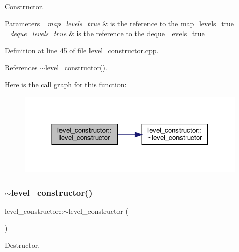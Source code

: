 Constructor. 


\begin{DoxyParams}{Parameters}
{\em \+\_\+map\+\_\+levels\+\_\+true} & is the reference to the map\+\_\+levels\+\_\+true \\
\hline
{\em \+\_\+deque\+\_\+levels\+\_\+true} & is the reference to the deque\+\_\+levels\+\_\+true \\
\hline
\end{DoxyParams}


Definition at line 45 of file level\+\_\+constructor.\+cpp.



References $\sim$level\+\_\+constructor().

Here is the call graph for this function\+:
\nopagebreak
\begin{figure}[H]
\begin{center}
\leavevmode
\includegraphics[width=310pt]{dd/d07/classlevel__constructor_af87499ee57672a337d8cb6e4261d5a47_cgraph}
\end{center}
\end{figure}
\mbox{\label{classlevel__constructor_aa52e6e3db284b6d0ca193cf60afb0aae}} 
\subsubsection{\texorpdfstring{$\sim$level\+\_\+constructor()}{~level\_constructor()}}
{\footnotesize\ttfamily level\+\_\+constructor\+::$\sim$level\+\_\+constructor (\begin{DoxyParamCaption}{ }\end{DoxyParamCaption})\hspace{0.3cm}{\ttfamily [default]}}



Destructor. 



